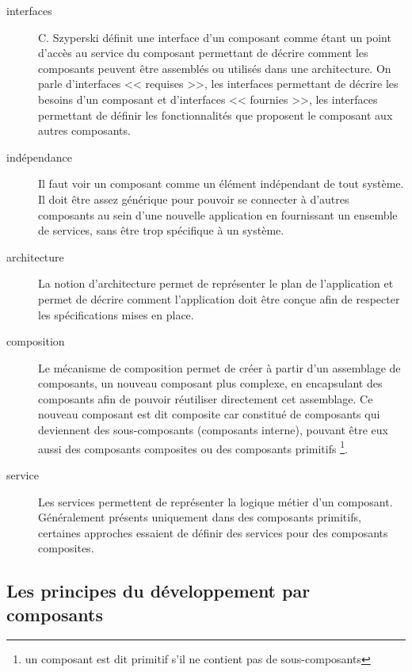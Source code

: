 \begin{description} 

  \item[interfaces] C. Szyperski définit une interface d'un composant comme étant un point d'accès au service du composant \cite{szyperski1999components} permettant de décrire comment les composants peuvent être assemblés ou utilisés dans une architecture. On parle d'interfaces << requises >>, les interfaces permettant de décrire les besoins d'un composant et d'interfaces << fournies >>, les interfaces permettant de définir les fonctionnalités que proposent le composant aux autres composants.
  
  \item[indépendance] Il faut voir un composant comme un élément indépendant de tout système. Il doit être assez générique pour pouvoir se connecter à d'autres composants au sein d'une nouvelle application en fournissant un ensemble de services, sans être trop spécifique à un système. 
  
  \item[architecture] La notion d'architecture permet de représenter le plan de l'application et permet de décrire comment l'application doit être conçue afin de respecter les spécifications mises en place.
  
  \item[composition] Le mécanisme de composition permet de créer à partir d'un assemblage de composants, un nouveau composant plus complexe, en encapsulant des composants afin de pouvoir réutiliser directement cet assemblage. Ce nouveau composant est dit composite car constitué de composants qui deviennent des sous-composants (composants interne), pouvant être eux aussi des composants composites ou des composants primitifs \footnote{un composant est dit primitif s'il ne contient pas de sous-composants}.
  
  \item[service] Les services permettent de représenter la logique métier d'un composant. Géné\-ralement présents uniquement dans des composants primitifs, certaines approches essaient de définir des services pour des composants composites. 
  
\end{description}
    
\subsection{Les principes du développement par composants}


